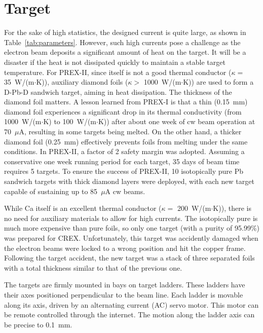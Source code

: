 \section{Target}
For the sake of high statistics, the designed current is quite large, as shown in
Table~\ref{tab:parameters}. However, such high currents pose a challenge as the 
electron beam deposits a significant amount of heat on the target. 
It will be a disaster if the heat is not dissipated quickly to maintain a stable
target temperature.
For PREX-II, since \Pb itself is not a good thermal conductor ($\kappa = $35~W/(m$\cdot$K)),
auxiliary diamond foils ($\kappa >$ 1000~W/(m$\cdot$K)) are used to form a D-Pb-D 
sandwich target, aiming in heat dissipation. The thickness of the diamond foil matters.
A lesson learned from PREX-I is that a thin (0.15~mm) diamond foil experiences a
significant drop in its thermal conductivity (from 1000~W/(m$\cdot$K) to 100~W/(m$\cdot$K)) 
after about one week of cw beam operation at 70~$\mu$A, resulting in some \Pb 
targets being melted. On the other hand, a thicker diamond foil (0.25~mm) 
effectively prevents \Pb foils from melting under the same conditions. 
In PREX-II, a factor of 2 safety margin was adopted.
Assuming a conservative one week running period for each \Pb target, 35 days of beam time
requires 5 targets. To ensure the success of PREX-II, 10 isotopically pure Pb 
sandwich targets with thick diamond layers were deployed, with each new target capable
of sustaining up to 85~$\mu$A cw beams.

While Ca itself is an excellent thermal conductor ($\kappa =$ 200~W/(m$\cdot$K)), 
there is no need for auxiliary materials to allow for high currents. 
The isotopically pure \Ca is much more expensive than pure \Pb foils, so only 
one \Ca target (with a purity of 95.99\%) was prepared for CREX.
Unfortunately, this \Ca target was accidently damaged when the electron beams
were locked to a wrong position and hit the copper frame.
Following the target accident, the new \Ca target was a stack of three separated foils with a total thickness similar to that of the previous one.

The targets are firmly mounted in bays on target ladders. These ladders have
their axes positioned perpendicular to the beam line. Each ladder is movable 
along its axis, driven by an alternating current (AC) servo motor. This motor
can be remote controlled through the internet. The motion along the ladder axis can be precise to 0.1~mm.

